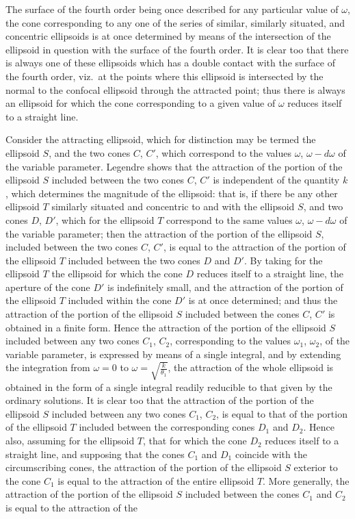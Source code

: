\documentclass[11pt,a4paper]{article}
\theoremstyle{definition}
\begin{document}
\newpage

\setcounter{page}{434}

The surface of the fourth order being once described for any particular value of $\omega$, the cone corresponding to any one of the series of similar, similarly situated, and concentric ellipsoids is at once determined by means of the intersection of the ellipsoid in question with the surface of the fourth order. It is clear too that there is always one of these ellipsoids which has a double contact with the surface of the fourth order, viz.\ at the points where this ellipsoid is intersected by the normal to the confocal ellipsoid through the attracted point; thus there is always an ellipsoid for which the cone corresponding to a given value of $\omega$ reduces itself to a straight line.

Consider the attracting ellipsoid, which for distinction may be termed the ellipsoid $S$, and the two cones $C$, $C'$, which correspond to the values $\omega$, $\omega - d\omega$ of the variable parameter. Legendre shows that the attraction of the portion of the ellipsoid $S$ included between the two cones $C$, $C'$ is independent of the quantity $k$, which determines the magnitude of the ellipsoid: that is, if there be any other ellipsoid $T$ similarly situated and concentric to and with the ellipsoid $S$, and two cones $D$, $D'$, which for the ellipsoid $T$ correspond to the same values $\omega$, $\omega - d\omega$ of the variable parameter; then the attraction of the portion of the ellipsoid $S$, included between the two cones $C$, $C'$, is equal to the attraction of the portion of the ellipsoid $T$ included between the two cones $D$ and $D'$. By taking for the ellipsoid $T$ the ellipsoid for which the cone $D$ reduces itself to a straight line, the aperture of the cone $D'$ is indefinitely small, and the attraction of the portion of the ellipsoid $T$ included within the cone $D'$ is at once determined; and thus the attraction of the portion of the ellipsoid $S$ included between the cones $C$, $C'$ is obtained in a finite form. Hence the attraction of the portion of the ellipsoid $S$ included between any two cones $C_{1}$, $C_{2}$, corresponding to the values $\omega_{1}$, $\omega_{2}$, of the variable parameter, is expressed by means of a single integral, and by extending the integration from $\omega = 0$ to $\omega = \sqrt{\frac{k}{\theta_{1}}}$, the attraction of the whole ellipsoid is obtained in the form of a single integral readily reducible to that given by the ordinary solutions. It is clear too that the attraction of the portion of the ellipsoid $S$ included between any two cones $C_{1}$, $C_{2}$, is equal to that of the portion of the ellipsoid $T$ included between the corresponding cones $D_{1}$ and $D_{2}$. Hence also, assuming for the ellipsoid $T$, that for which the cone $D_{2}$ reduces itself to a straight line, and supposing that the cones $C_{1}$ and $D_{1}$ coincide with the circumscribing cones, the attraction of the portion of the ellipsoid $S$ exterior to the cone $C_{1}$ is equal to the attraction of the entire ellipsoid $T$. More generally, the attraction of the portion of the ellipsoid $S$ included between the cones $C_{1}$ and $C_{2}$ is equal to the attraction of the 
\end{document}
